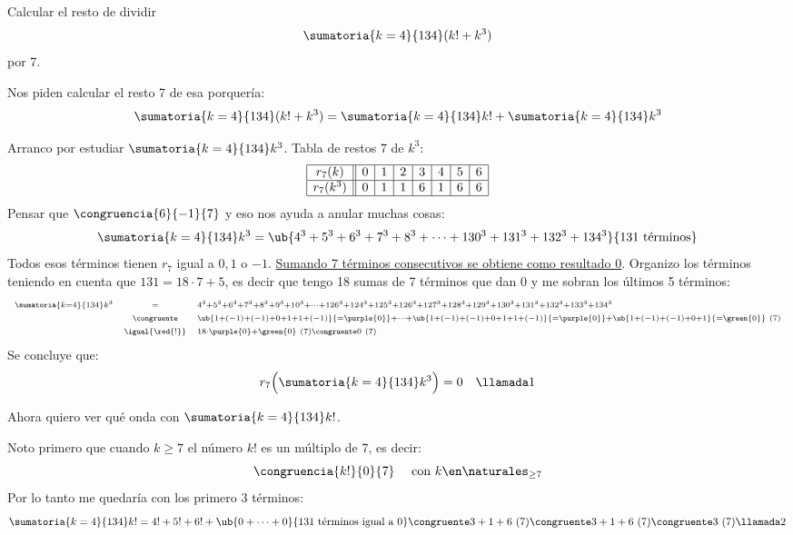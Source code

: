 \begin{enunciado}{\ejExtra}
  Calcular el resto de dividir
  $$
    \sumatoria{k = 4}{134} (k! + k^3)
  $$
  por 7.
\end{enunciado}

Nos piden calcular el resto 7 de esa porquería:
$$
  \sumatoria{k = 4}{134} (k! + k^3)
  =
  \sumatoria{k = 4}{134} k! + \sumatoria{k = 4}{134} k^3
$$

Arranco por estudiar $\sumatoria{k = 4}{134} k^3$. Tabla de restos 7 de $k^3$:
$$
  \begin{array}{|c||c|c|c|c|c|c|c|}
    \hline
    r_7(k)   & 0 & 1 & 2 & 3 & 4 & 5 & 6 \\ \hline
    r_7(k^3) & 0 & 1 & 1 & 6 & 1 & 6 & 6 \\ \hline
  \end{array}
$$
Pensar que $\congruencia{6}{-1}{7}$ y eso nos ayuda a anular muchas cosas:
$$
  \sumatoria{k = 4}{134} k^3 = \ub{4^3 + 5^3 + 6^3 + 7^3 + 8^3 + \cdots + 130^3 + 131^3 + 132^3 + 134^3}{131 \text{ términos}}
$$
Todos esos términos tienen $r_7$ igual a $0, 1$ o $-1$. \underline{Sumando 7 términos consecutivos se obtiene como resultado 0}. Organizo los términos teniendo en cuenta que
$131 = 18 \cdot 7 + 5 $, es decir que tengo 18 sumas de 7 términos que dan 0 y me sobran los últimos 5 términos:
$$
  \scriptstyle
  \begin{array}{rcl}
    \scriptstyle
    \sumatoria{k = 4}{134} k^3 & \scriptstyle=                & \scriptstyle4^3 + 5^3 + 6^3 + 7^3 + 8^3 + 9^3 + 10^3 + \cdots + 126^3 + 124^3+125^3+126^3+ 127^3 + 128^3 + 129^3 + 130^3 + 131^3 + 132^3 + 133^3 + 134^3                                         \\
                               & \scriptstyle \congruente     & \scriptstyle \ub{\scriptstyle1 + (-1) + (-1) + 0 + 1 + 1 + (-1)}{= \purple{0}} + \cdots +  \ub{\scriptstyle1 + (-1) + (-1) + 0 + 1 + 1 + (-1)}{= \purple{0}} + \ub{ \scriptstyle1 + (-1) + (-1) + 0 + 1}{= \green{0}} \ (7) \\
                               & \scriptstyle \igual{\red{!}} & \scriptstyle 18 \cdot \purple{0} + \green{0}\ (7) \congruente 0\ (7)
  \end{array}
$$
Se concluye que:
$$
  r_7\Big( \sumatoria{k = 4}{134} k^3\Big) = 0 \quad\llamada1
$$
\bigskip

Ahora quiero ver qué onda con $\sumatoria{k = 4}{134}k!$.\par
Noto primero que cuando $k \geq 7$ el número $k!$ es un múltiplo de 7, es decir:
$$
  \congruencia{k!}{0}{7} \quad \text{ con } k \en \naturales_{\geq 7}
$$
Por lo tanto me quedaría con los primero 3 términos:
$$
  \sumatoria{k = 4}{134} k! = 4! + 5! + 6! + \ub{ 0 + \cdots + 0}{131 \text{ términos igual a 0}}
  \congruente
  3 + 1 + 6 \ (7)
  \congruente
  3 + 1 + 6 \ (7)
  \congruente
  3 \ (7) \llamada2
$$


